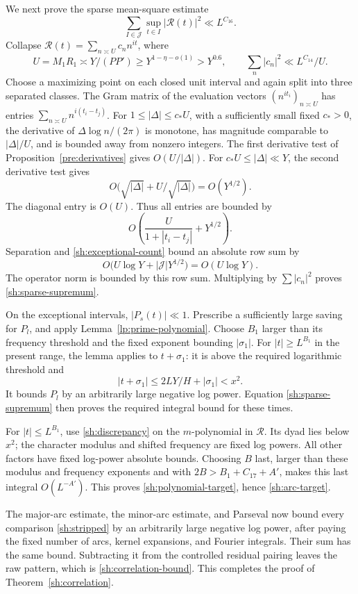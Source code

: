 We next prove the sparse mean-square estimate
\begin{equation}\label{sh:sparse-supremum}
 \sum_{I\in\mathcal J}\sup_{t\in I}|\mathcal R(t)|^2
 \ll L^{C_{16}}.
\end{equation}
Collapse $\mathcal R(t)=\sum_{n\asymp U}c_nn^{it}$, where
\[
 U=M_1R_1\asymp Y/(PP')\geq Y^{1-\eta-o(1)}>Y^{0.6},
 \qquad \sum_n|c_n|^2\ll L^{C_{14}}/U.
\]
Choose a maximizing point on each closed unit interval and again
split into three separated classes.  The Gram matrix of the
evaluation vectors $(n^{it_i})_{n\asymp U}$ has entries
$\sum_{n\asymp U}n^{i(t_i-t_j)}$.  For
$1\leq|\Delta|\leq c_*U$, with a sufficiently small fixed $c_*>0$,
the derivative of $\Delta\log n/(2\pi)$ is monotone, has magnitude
comparable to $|\Delta|/U$, and is bounded away from nonzero
integers.  The first derivative test of
Proposition~\ref{pre:derivatives} gives $O(U/|\Delta|)$.
For $c_*U\leq|\Delta|\ll Y$, the second derivative test gives
\[
 O\big(\sqrt{|\Delta|}+U/\sqrt{|\Delta|}\big)=O(Y^{1/2}).
\]
The diagonal entry is $O(U)$.  Thus all entries are bounded by
\[
 O\left(\frac{U}{1+|t_i-t_j|}+Y^{1/2}\right).
\]
Separation and \eqref{sh:exceptional-count} bound an absolute row
sum by
\[
 O\big(U\log Y+|\mathcal J|Y^{1/2}\big)=O(U\log Y).
\]
The operator norm is bounded by this row sum.  Multiplying by
$\sum|c_n|^2$ proves \eqref{sh:sparse-supremum}.

On the exceptional intervals, $|P_s(t)|\ll1$.  Prescribe a
sufficiently large saving for $P_l$, and apply
Lemma~\ref{lp:prime-polynomial}.  Choose $B_1$ larger than its
frequency threshold and the fixed exponent bounding $|\sigma_1|$.
For $|t|\geq L^{B_1}$ in the present range, the lemma applies to
$t+\sigma_1$: it is above the required logarithmic threshold and
\[
 |t+\sigma_1|\leq2LY/H+|\sigma_1|<x^2.
\]
It bounds $P_l$ by an arbitrarily large negative log power.
Equation \eqref{sh:sparse-supremum} then proves the required
integral bound for these times.

For $|t|\leq L^{B_1}$, use \eqref{sh:discrepancy} on the
$m$-polynomial in $\mathcal R$.  Its dyad lies below $x^2$;
the character modulus and shifted frequency are fixed log powers.
All other factors have fixed log-power absolute bounds.  Choosing
$B$ last, larger than these modulus and frequency exponents and
with $2B>B_1+C_{17}+A'$, makes this last integral $O(L^{-A'})$.
This proves \eqref{sh:polynomial-target}, hence
\eqref{sh:arc-target}.

The major-arc estimate, the minor-arc estimate, and Parseval now
bound every comparison \eqref{sh:stripped} by an arbitrarily large
negative log power, after paying the fixed number of arcs, kernel
expansions, and Fourier integrals.  Their sum has the same bound.
Subtracting it from the controlled residual pairing leaves the raw
pattern, which is \eqref{sh:correlation-bound}.  This completes
the proof of Theorem~\ref{sh:correlation}.

